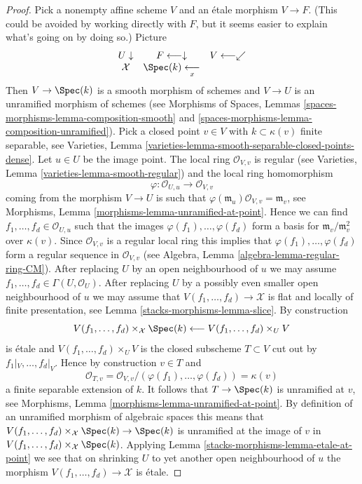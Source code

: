 \begin{proof}
\medskip\noindent
Pick a nonempty affine scheme $V$ and an \'etale morphism $V \to F$.
(This could be avoided by working directly with $F$, but it seems easier
to explain what's going on by doing so.) Picture
$$
\begin{array}{ccc}U \downarrow & F  \longleftarrow\downarrow & V \longleftarrow\swarrow \\ \mathcal{X} & \Spec(k) \underset{x}{\longleftarrow} & \end{array}
$$
Then $V \to \Spec(k)$ is a smooth morphism of schemes and $V \to U$ is an
unramified morphism of schemes (see
Morphisms of Spaces, Lemmas
\ref{spaces-morphisms-lemma-composition-smooth} and
\ref{spaces-morphisms-lemma-composition-unramified}).
Pick a closed point $v \in V$ with $k \subset \kappa(v)$ finite separable, see
Varieties, Lemma \ref{varieties-lemma-smooth-separable-closed-points-dense}.
Let $u \in U$ be the image point. The local ring
$\mathcal{O}_{V, v}$ is regular (see
Varieties, Lemma \ref{varieties-lemma-smooth-regular})
and the local ring homomorphism
$$
\varphi : \mathcal{O}_{U, u} \longrightarrow \mathcal{O}_{V, v}
$$
coming from the morphism $V \to U$ is such that
$\varphi(\mathfrak m_u)\mathcal{O}_{V, v} = \mathfrak m_v$, see
Morphisms, Lemma \ref{morphisms-lemma-unramified-at-point}.
Hence we can find $f_1, \ldots, f_d \in \mathcal{O}_{U, u}$
such that the images $\varphi(f_1), \ldots, \varphi(f_d)$
form a basis for $\mathfrak m_v/\mathfrak m_v^2$ over $\kappa(v)$.
Since $\mathcal{O}_{V, v}$ is a regular local ring this implies
that $\varphi(f_1), \ldots, \varphi(f_d)$ form a regular sequence
in $\mathcal{O}_{V, v}$ (see
Algebra, Lemma \ref{algebra-lemma-regular-ring-CM}).
After replacing $U$ by an open neighbourhood of $u$ we may assume
$f_1, \ldots, f_d \in \Gamma(U, \mathcal{O}_U)$. After replacing
$U$ by a possibly even smaller open neighbourhood of $u$ we may
assume that $V(f_1, \ldots, f_d) \to \mathcal{X}$ is flat and
locally of finite presentation, see
Lemma \ref{stacks-morphisms-lemma-slice}.
By construction
$$
V(f_1, \ldots, f_d) \times_\mathcal{X} \Spec(k)
\longleftarrow
V(f_1, \ldots, f_d) \times_U V
$$
is \'etale and $V(f_1, \ldots, f_d) \times_U V$
is the closed subscheme $T \subset V$ cut out by $f_1|_V, \ldots, f_d|_V$.
Hence by construction $v \in T$ and
$$
\mathcal{O}_{T, v} =
\mathcal{O}_{V, v}/(\varphi(f_1), \ldots, \varphi(f_d)) = \kappa(v)
$$
a finite separable extension of $k$. It follows that $T \to \Spec(k)$
is unramified at $v$, see
Morphisms, Lemma \ref{morphisms-lemma-unramified-at-point}.
By definition of an unramified morphism of algebraic spaces this means that
$V(f_1, \ldots, f_d) \times_\mathcal{X} \Spec(k) \to \Spec(k)$
is unramified at the image of $v$ in
$V(f_1, \ldots, f_d) \times_\mathcal{X} \Spec(k)$.
Applying
Lemma \ref{stacks-morphisms-lemma-etale-at-point}
we see that on shrinking $U$ to yet another open neighbourhood of $u$
the morphism $V(f_1, \ldots, f_d) \to \mathcal{X}$ is \'etale.


\end{proof}
